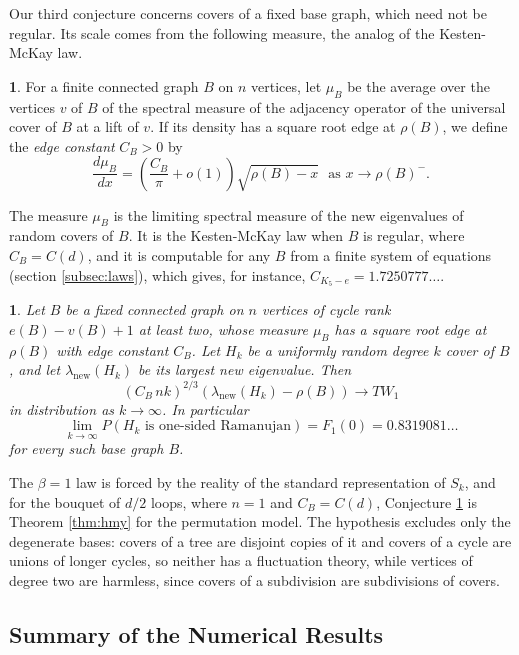 \documentclass[12pt,oneside,english]{amsart}
\numberwithin{equation}{section}
\numberwithin{figure}{section}
\numberwithin{table}{section}
\theoremstyle{plain}
\numberwithin{thm}{section}
\theoremstyle{plain}
\theoremstyle{plain}
\theoremstyle{plain}
\newtheorem{conjecture}[thm]{\protect\conjecturename}
\theoremstyle{definition}
\newtheorem{defn}[thm]{\protect\definitionname}
\theoremstyle{definition}
\theoremstyle{definition}
\theoremstyle{remark}
\providecommand{\conjecturename}{Conjecture}
\providecommand{\definitionname}{Definition}
\begin{document}
Our third conjecture concerns covers of a fixed base graph, which
need not be regular. Its scale comes from the following measure, the
analog of the Kesten-McKay law.
\begin{defn}
\label{def:mu_B}For a finite connected graph $B$ on $n$ vertices,
let $\mu_{B}$ be the average over the vertices $v$ of $B$ of the
spectral measure of the adjacency operator of the universal cover
of $B$ at a lift of $v$. If its density has a square root edge at
$\rho(B)$, we define the \emph{edge constant} $C_{B}>0$ by
\[
\frac{d\mu_{B}}{dx}=\left(\frac{C_{B}}{\pi}+o(1)\right)\sqrt{\rho(B)-x}\ \ \ \text{as }x\rightarrow\rho(B)^{-}.
\]
\end{defn}
The measure $\mu_{B}$ is the limiting spectral measure of the new
eigenvalues of random covers of $B$. It is the Kesten-McKay law when
$B$ is regular, where $C_{B}=C(d)$, and it is computable for any
$B$ from a finite system of equations (section \ref{subsec:laws}),
which gives, for instance, $C_{K_{5}-e}=1.7250777\dots$.
\begin{conjecture}
\label{conj:irregular_base}Let $B$ be a fixed connected graph on
$n$ vertices of cycle rank $e(B)-v(B)+1$ at least two, whose measure
$\mu_{B}$ has a square root edge at $\rho(B)$ with edge constant
$C_{B}$. Let $H_{k}$ be a uniformly random degree $k$ cover of $B$,
and let $\lambda_{\mathrm{new}}(H_{k})$ be its largest new eigenvalue.
Then
\[
\left(C_{B}\,nk\right)^{2/3}\left(\lambda_{\mathrm{new}}(H_{k})-\rho(B)\right)\rightarrow TW_{1}
\]
in distribution as $k\rightarrow\infty$. In particular
\[
\lim_{k\rightarrow\infty}P\left(H_{k}\text{ is one-sided Ramanujan}\right)=F_{1}(0)=0.8319081\dots
\]
for every such base graph $B$.
\end{conjecture}
The $\beta=1$ law is forced by the reality of the standard representation
of $S_{k}$, and for the bouquet of $d/2$ loops, where $n=1$ and $C_{B}=C(d)$,
Conjecture \ref{conj:irregular_base} is Theorem \ref{thm:hmy} for
the permutation model. The hypothesis excludes only the degenerate
bases: covers of a tree are disjoint copies of it and covers of a cycle
are unions of longer cycles, so neither has a fluctuation theory, while
vertices of degree two are harmless, since covers of a subdivision
are subdivisions of covers.

\subsection{\label{subsec:summary}Summary of the Numerical Results}
\end{document}
